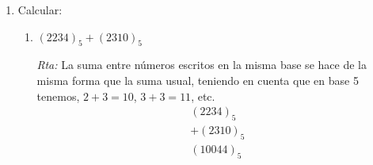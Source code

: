 \documentclass[a4paper,12pt,twoside,spanish,reqno]{amsbook}
\numberwithin{equation}{section}
\newcommand{\rta}{\noindent\textit{Rta: }}
\begin{document}
\begin{enumerate}
\begin{enumerate}
    \rta  $(3506)_7 = 3\times 7^3+5\times 7^2+6= 1280$. Ahora debemos escribir 1280 en base 2
    \begin{align*}
    1280 &= 2 \times 640 + 0 \\
    640 &= 2 \times 320 + 0 \\
    320 &= 2 \times 160 + 0 \\
    160 &= 2 \times 80 + 0 \\
    80 &= 2 \times 40 + 0 \\        
    40 &= 2 \times 20 +0\\
    20 &= 2 \times 10 + 0\\
    10&= 2 \times 5+0 \\
    5&= 2 \times 2 +1 \\
    2&= 2 \times 1+ 0\\
    1 &= 2 \times 0 + 1.
    \end{align*}
    Luego $(3506)_7 = (10100000000)_2$. 
    
    Hay una forma de hacer este ejercicio más corta: observar que $1280 = 2^7\times 10 = 2^8\times 5 = 2^8\times (2^2 +1) = 2^{10} + 2^8$. 
    \item
    $(1541)_6$ a base 4. 
    
     \rta  $6^3+5\times 6^2+4\times 6+1=54\times 4+45\times 4+6\times 4=105\times 4=420$. Luego,
     \begin{align*}
         420 &= 4 \times 105 + 0 \\
         105 &= 4 \times 26 +1 \\
         26 &= 4 \times 6 +2 \\
         6 &= 4 \times 1 +2 \\
         1 &= 4 \times 0 +1.
     \end{align*}
     Entonces, $(1541)_6=(12210)_4$.
\end{enumerate}




\item Calcular: 
\begin{enumerate} 
    \item
    $(2234)_5 + (2310)_5$  
    
    \rta La suma entre números escritos en la misma base se hace de la misma forma que la suma usual, teniendo en cuenta que en base 5 tenemos, $2+3 = 10$, $3+3 = 11$, etc.
    \begin{equation*}
        \begin{array}{r}
        (2234)_5 \\
        +(2310)_5 \\
        \hline 
        (10044)_5
        \end{array}
    \end{equation*}
    


\end{enumerate}
\end{enumerate}
\end{document}
